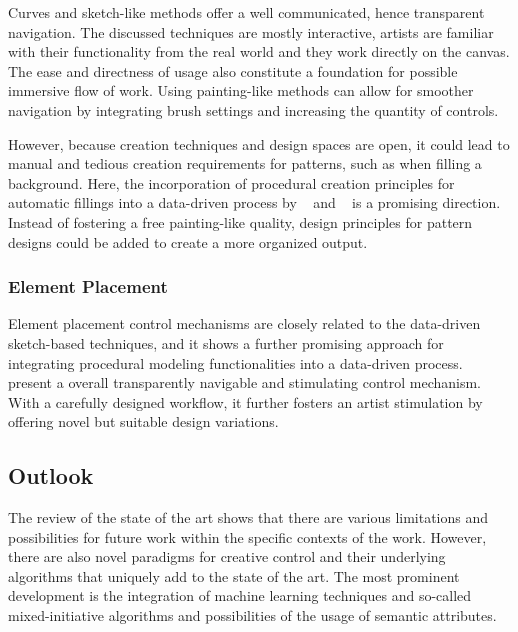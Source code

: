 Curves and sketch-like methods offer a well communicated, hence transparent navigation. 
The discussed techniques are mostly interactive, artists are familiar with their functionality from the real world and they work directly on the canvas. The ease and directness of usage also constitute a foundation for possible immersive flow of work. Using painting-like methods can allow for smoother navigation by integrating brush settings and increasing the quantity of controls.

However, because creation techniques and design spaces are open, it could lead to manual and tedious creation requirements for patterns, such as when filling a background. Here, the incorporation of procedural creation principles for automatic fillings into a data-driven process by \citeauthor*{kazi_2012_vit}~\cite{kazi_2012_vit} and \citeauthor*{xing_2014_apr}~\cite{xing_2014_apr} is a promising direction. Instead of fostering a free painting-like quality, design principles for pattern designs could be added to create a more organized output.

\subsubsection{Element Placement}
\label{subsubsec:analysis_creative_means_elements}

Element placement control mechanisms are closely related to the data-driven sketch-based techniques, and it shows a further promising approach for integrating procedural modeling functionalities into a data-driven process. 
\citeauthor*{guerrero_2016_pep}~\cite{guerrero_2016_pep} present a overall transparently navigable and stimulating control mechanism. With a carefully designed workflow, it further fosters an artist stimulation by offering novel but suitable design variations.


\subsection{Outlook}
\label{subsec:analysis_outlook}

The review of the state of the art shows that there are various limitations and possibilities for future work within the specific contexts of the work. However, there are also novel paradigms for creative control and their underlying algorithms that uniquely add to the state of the art. The most prominent development is the integration of machine learning techniques and so-called mixed-initiative algorithms and possibilities of the usage of semantic attributes.

